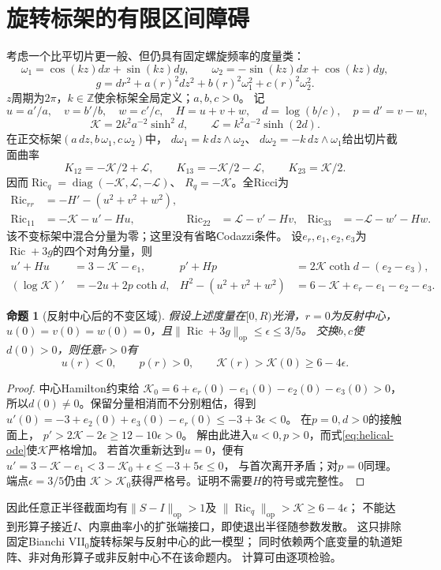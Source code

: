 \documentclass[UTF8,a4paper,11pt,fontset=fandol]{ctexart}
\numberwithin{equation}{section}
\newtheorem{proposition}[theorem]{命题}
\theoremstyle{definition}
\newcommand{\Ric}{\operatorname{Ric}}
\newcommand{\op}{\mathrm{op}}
\newcommand{\Z}{\mathbb Z}
\begin{document}
\section{旋转标架的有限区间障碍}
考虑一个比平切片更一般、但仍具有固定螺旋频率的度量类：
\[
 \omega_1=\cos(kz)dx+\sin(kz)dy,\qquad
 \omega_2=-\sin(kz)dx+\cos(kz)dy,
\]
\[
 g=dr^2+a(r)^2dz^2+b(r)^2\omega_1^2+c(r)^2\omega_2^2.
\]
$z$周期为$2\pi$，$k\in\Z$使余标架全局定义；$a,b,c>0$。
记
\[
 u=a'/a,\quad v=b'/b,\quad w=c'/c,\quad H=u+v+w,\quad
 d=\log(b/c),\quad p=d'=v-w,
\]
\[
 \mathcal K=2k^2a^{-2}\sinh^2d,\qquad
 \mathcal L=k^2a^{-2}\sinh(2d).
\]
在正交标架$(a\,dz,b\,\omega_1,c\,\omega_2)$中，
$d\omega_1=k\,dz\wedge\omega_2$、
$d\omega_2=-k\,dz\wedge\omega_1$给出切片截面曲率
\[
 K_{12}=-\mathcal K/2+\mathcal L,\qquad
 K_{13}=-\mathcal K/2-\mathcal L,\qquad K_{23}=\mathcal K/2.
\]
因而$\Ric_q=\operatorname{diag}(-\mathcal K,\mathcal L,-\mathcal L)$、
$R_q=-\mathcal K$。全Ricci为
\begin{align*}
 \Ric_{rr}&=-H'-(u^2+v^2+w^2),\\
 \Ric_{11}&=-\mathcal K-u'-Hu,&
 \Ric_{22}&=\mathcal L-v'-Hv,&
 \Ric_{33}&=-\mathcal L-w'-Hw.
\end{align*}
该不变标架中混合分量为零；这里没有省略Codazzi条件。
设$e_r,e_1,e_2,e_3$为$\Ric+3g$的四个对角分量，则
\begin{align}
 u'+Hu&=3-\mathcal K-e_1,&
 p'+Hp&=2\mathcal K\coth d-(e_2-e_3),\label{eq:helical-ode}\\
 (\log\mathcal K)'&=-2u+2p\coth d,&
 H^2-(u^2+v^2+w^2)&=6-\mathcal K+e_r-e_1-e_2-e_3.\nonumber
\end{align}

\begin{proposition}[反射中心后的不变区域]\label{prop:helical}
假设上述度量在$[0,R)$光滑，$r=0$为反射中心，
$u(0)=v(0)=w(0)=0$，且$\|\Ric+3g\|_{\op}\le\epsilon\le3/5$。
交换$b,c$使$d(0)>0$，则任意$r>0$有
\[
 u(r)<0,\qquad p(r)>0,\qquad
 \mathcal K(r)>\mathcal K(0)\ge6-4\epsilon.
\]
\end{proposition}
\begin{proof}
中心Hamilton约束给
$\mathcal K_0=6+e_r(0)-e_1(0)-e_2(0)-e_3(0)>0$，
所以$d(0)\ne0$。保留分量相消而不分别粗估，得到
$u'(0)=-3+e_2(0)+e_3(0)-e_r(0)\le-3+3\epsilon<0$。
在$p=0,d>0$的接触面上，
$p'>2\mathcal K-2\epsilon\ge12-10\epsilon>0$。
解由此进入$u<0,p>0$，而式\eqref{eq:helical-ode}使$\mathcal K$严格增加。
若首次重新达到$u=0$，便有
$u'=3-\mathcal K-e_1<3-\mathcal K_0+\epsilon\le-3+5\epsilon\le0$，
与首次离开矛盾；对$p=0$同理。端点$\epsilon=3/5$仍由
$\mathcal K>\mathcal K_0$获得严格号。证明不需要$H$的符号或完整性。
\end{proof}
因此任意正半径截面均有$\|S-I\|_{\op}>1$及
$\|\Ric_q\|_{\op}>\mathcal K\ge6-4\epsilon$；
不能达到形算子接近$I$、内禀曲率小的扩张端接口，即使退出半径随参数发散。
这只排除固定Bianchi VII$_0$旋转标架与反射中心的此一模型；
同时依赖两个底变量的轨道矩阵、非对角形算子或非反射中心不在该命题内。
计算可由逐项检验。
\end{document}
